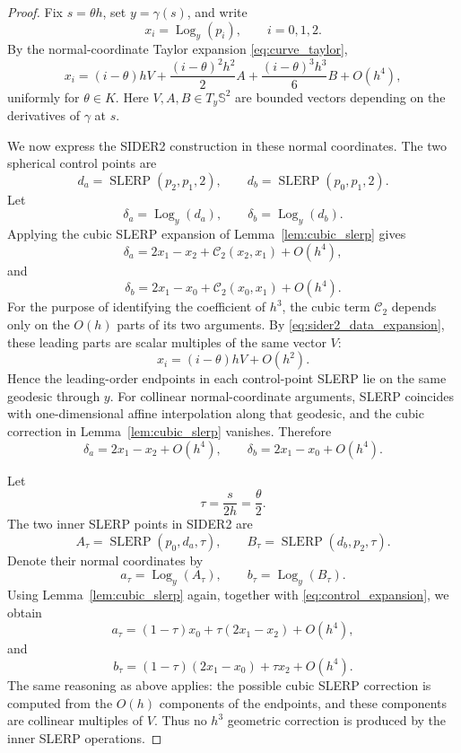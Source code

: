 \documentclass[a4paper,11pt]{article}
\newcommand{\bS}{\mathbb{S}}
\newcommand{\Log}{\operatorname{Log}}
\newcommand{\SLERP}{\operatorname{SLERP}}
\numberwithin{equation}{section}
\begin{document}
\begin{proof}
Fix \(s=\theta h\), set \(y=\gamma(s)\), and write
\[
        x_i=\Log_y(p_i),\qquad i=0,1,2.
\]
By the normal-coordinate Taylor expansion \eqref{eq:curve_taylor},
\begin{equation}
\label{eq:sider2_data_expansion}
x_i
=
(i-\theta)hV
+
\frac{(i-\theta)^2h^2}{2}A
+
\frac{(i-\theta)^3h^3}{6}B
+
O(h^4),
\end{equation}
uniformly for \(\theta\in K\).  Here \(V,A,B\in T_y\bS^2\) are bounded
vectors depending on the derivatives of \(\gamma\) at \(s\).

We now express the SIDER2 construction in these normal coordinates.  The two
spherical control points are
\[
        d_a=\SLERP(p_2,p_1,2),
        \qquad
        d_b=\SLERP(p_0,p_1,2).
\]
Let
\[
        \delta_a=\Log_y(d_a),\qquad
        \delta_b=\Log_y(d_b).
\]
Applying the cubic SLERP expansion of Lemma~\ref{lem:cubic_slerp} gives
\[
        \delta_a=2x_1-x_2+\mathcal C_2(x_2,x_1)+O(h^4),
\]
and
\[
        \delta_b=2x_1-x_0+\mathcal C_2(x_0,x_1)+O(h^4).
\]
For the purpose of identifying the coefficient of \(h^3\), the cubic term
\(\mathcal C_2\) depends only on the \(O(h)\) parts of its two arguments.  By
\eqref{eq:sider2_data_expansion}, these leading parts are scalar multiples of
the same vector \(V\):
\[
        x_i=(i-\theta)hV+O(h^2).
\]
Hence the leading-order endpoints in each control-point SLERP lie on the same
geodesic through \(y\).  For collinear normal-coordinate arguments, SLERP
coincides with one-dimensional affine interpolation along that geodesic, and
the cubic correction in Lemma~\ref{lem:cubic_slerp} vanishes.  Therefore
\begin{equation}
\label{eq:control_expansion}
        \delta_a=2x_1-x_2+O(h^4),
        \qquad
        \delta_b=2x_1-x_0+O(h^4).
\end{equation}

Let
\[
        \tau=\frac{s}{2h}=\frac{\theta}{2}.
\]
The two inner SLERP points in SIDER2 are
\[
        A_\tau=\SLERP(p_0,d_a,\tau),
        \qquad
        B_\tau=\SLERP(d_b,p_2,\tau).
\]
Denote their normal coordinates by
\[
        a_\tau=\Log_y(A_\tau),\qquad
        b_\tau=\Log_y(B_\tau).
\]
Using Lemma~\ref{lem:cubic_slerp} again, together with
\eqref{eq:control_expansion}, we obtain
\[
        a_\tau
        =
        (1-\tau)x_0+\tau(2x_1-x_2)+O(h^4),
\]
and
\[
        b_\tau
        =
        (1-\tau)(2x_1-x_0)+\tau x_2+O(h^4).
\]
The same reasoning as above applies: the possible cubic SLERP correction is
computed from the \(O(h)\) components of the endpoints, and these components
are collinear multiples of \(V\).  Thus no \(h^3\) geometric correction is
produced by the inner SLERP operations.


\end{proof}
\end{document}
